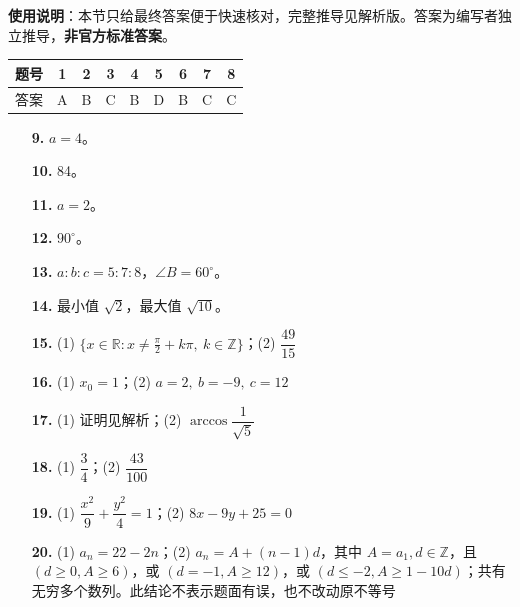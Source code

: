 
\begin{gknotice}
\textbf{使用说明}：本节只给最终答案便于快速核对，完整推导见解析版。答案为编写者独立推导，\textbf{非官方标准答案}。
\end{gknotice}

\begin{center}\begin{tabular}{ccccccccc}
\toprule
题号 & 1 & 2 & 3 & 4 & 5 & 6 & 7 & 8 \\
\midrule
答案 & A & B & C & B & D & B & C & C \\
\bottomrule
\end{tabular}\end{center}

\begin{itemize}[leftmargin=2.6em]
  \item[\textbf{9.}] $a=4$。
  \item[\textbf{10.}] 84。
  \item[\textbf{11.}] $a=2$。
  \item[\textbf{12.}] $90^\circ$。
  \item[\textbf{13.}] $a:b:c=5:7:8$，$\angle B=60^\circ$。
  \item[\textbf{14.}] 最小值 $\sqrt2$，最大值 $\sqrt{10}$。
\end{itemize}

\begin{itemize}[leftmargin=2.6em]
  \item[\textbf{15.}] (1) $\{x\in\mathbb R:x\ne\frac\pi2+k\pi,\ k\in\mathbb Z\}$；(2) $\dfrac{49}{15}$
  \item[\textbf{16.}] (1) $x_0=1$；(2) $a=2,\ b=-9,\ c=12$
  \item[\textbf{17.}] (1) 证明见解析；(2) $\arccos\dfrac1{\sqrt5}$
  \item[\textbf{18.}] (1) $\dfrac34$；(2) $\dfrac{43}{100}$
  \item[\textbf{19.}] (1) $\dfrac{x^2}{9}+\dfrac{y^2}{4}=1$；(2) $8x-9y+25=0$
  \item[\textbf{20.}] (1) $a_n=22-2n$；(2) $a_n=A+(n-1)d$，其中 $A=a_1,d\in\mathbb Z$，且 $(d\ge0,A\ge6)$，或 $(d=-1,A\ge12)$，或 $(d\le-2,A\ge1-10d)$；共有无穷多个数列。此结论不表示题面有误，也不改动原不等号
\end{itemize}
